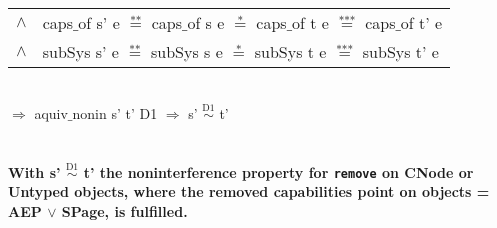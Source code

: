 \begin{itemize}
\begin{tabular}{ll}
$\wedge$ & caps$\_$of s' e $\overset{\text{**}}{=}$ caps$\_$of s e $\overset{\text{*}}{=}$ caps$\_$of t e $\overset{\text{***}}{=}$ caps$\_$of t' e \\
$\wedge$ & subSys s' e $\overset{\text{**}}{=}$ subSys s e $\overset{\text{*}}{=}$ subSys t e $\overset{\text{***}}{=}$ subSys t' e
\end{tabular} \\
$\Rightarrow$ aquiv$\_$nonin s' t' D1 $\Rightarrow$ s' $\overset{\text{D1}}{\sim}$ t' \\ \\ \\
\textbf{With s' $\overset{\text{D1}}{\sim}$ t' the noninterference property for \texttt{remove} on CNode or Untyped objects, where the removed capabilities point on objects = AEP $\vee$ SPage, is fulfilled.}  
\clearpage
\end{itemize}
